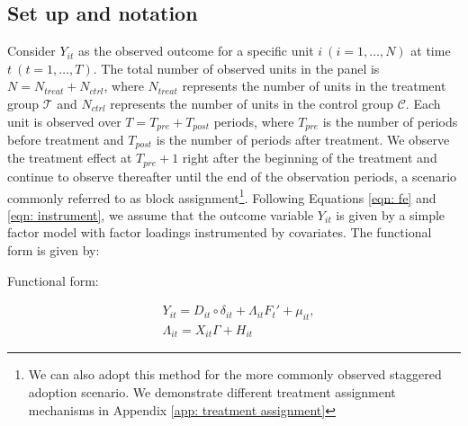 \documentclass[12pt]{article}
\begin{document}
\subsection{Set up and notation} 
\label{sec: set up}
Consider $Y_{it}$ as the observed outcome for a specific unit $i \ (i = 1, \dots, N)$ at time $t \ (t = 1, \dots, T)$. The total number of observed units in the panel is $N = N_{treat} + N_{ctrl}$, where $N_{treat}$ represents the number of units in the treatment group $\mathcal{T}$ and $N_{ctrl}$ represents the number of units in the control group $\mathcal{C}$. Each unit is observed over $T = T_{pre} + T_{post}$ periods, where $T_{pre}$ is the number of periods before treatment and $T_{post}$ is the number of periods after treatment. We observe the treatment effect at $T_{pre} + 1$ right after the beginning of the treatment and continue to observe thereafter until the end of the observation periods, a scenario commonly referred to as block assignment\footnote{We can also adopt this method for the more commonly observed staggered adoption scenario. We demonstrate different treatment assignment mechanisms in Appendix \ref{app: treatment assignment}}. Following Equations \ref{eqn: fe} and \ref{eqn: instrument}, we assume that the outcome variable $Y_{it}$ is given by a simple factor model with factor loadings instrumented by covariates. The functional form is given by:

\begin{assumption}
Functional form:
\label{ass: function}
\end{assumption}

\begin{equation}
\begin{aligned}
& Y_{it} = D_{it} \circ \delta_{it} + \Lambda_{it}F_{t}' + \mu_{it}, \\
& \Lambda_{it} = X_{it}\Gamma + H_{it}
\end{aligned}
\label{eqn: functional form}
\end{equation}
\end{document}
